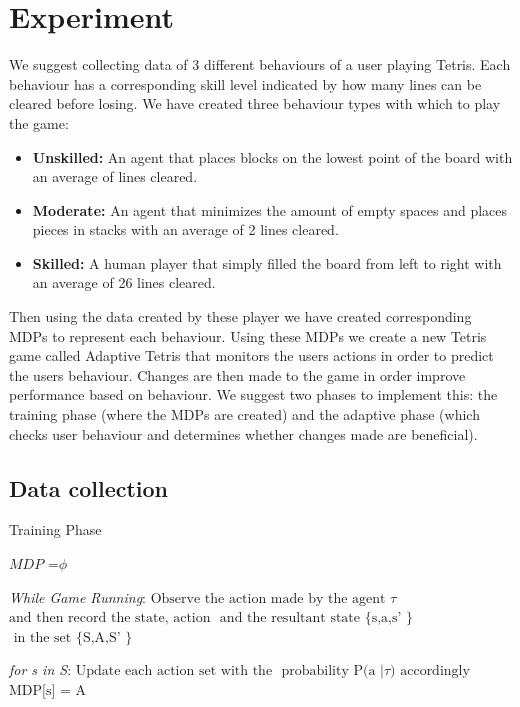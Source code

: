 \documentclass[11pt]{article}
\begin{document}
\vspace{6.0 mm}
\clearpage
\section{Experiment}

We suggest collecting data of 3 different behaviours of a user playing Tetris. Each behaviour has a corresponding skill level indicated by how many lines can be cleared before losing. We have created three behaviour types with which to play the game:
\begin{itemize}
\item \textbf{Unskilled:} An agent that places blocks on the lowest point of the board with an average of lines cleared.
\item \textbf{Moderate:} An agent that minimizes the amount of empty spaces and places pieces in stacks with an average of 2 lines cleared.
\item \textbf{Skilled:} A human player that simply filled the board from left to right with an average of 26 lines cleared.
\end{itemize}
Then using the data created by these player we have created corresponding MDPs to represent each behaviour. Using these MDPs we create a new Tetris game called Adaptive Tetris that monitors the users actions in order to predict the users behaviour. Changes are then made to the game in order improve performance based on behaviour.
We suggest two phases to implement this: the training phase (where the MDPs are created) and the adaptive phase (which checks user behaviour and determines whether changes made are beneficial).
\subsection{    Data collection}

\begin{algorithm}
\caption{Training Phase}\label{euclid}
\begin{algorithmic}[1]
\State $\textit{MDP =} \phi$

\BState \emph{While Game Running}:
\State $\text{Observe the action made by the agent } \tau $
\State $\text{and then record the state, action }$
\State $\text{and the resultant state \{ s,a,s' \} }$
\State $\text{ in the set \{ S,A,S' \} }$

\BState \emph{for s in S}:
\State $\text{Update each action set with the}$
\State $\text{ probability P(a } |  \tau \text{) accordingly }$
\State $\text{MDP[s] = A}$
\EndProcedure
\end{algorithmic}
\end{algorithm}
\end{document}

